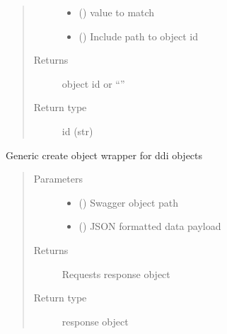 \documentclass[letterpaper,10pt,english]{sphinxmanual}
\begin{document}
\begin{fulllineitems}
\begin{fulllineitems}
\begin{quote}
\begin{description}
\begin{itemize}
\item {} 
\sphinxAtStartPar
{} () \textendash{} value to match

\item {} 
\sphinxAtStartPar
{} () \textendash{} Include path to object id

\end{itemize}

\item[{Returns}] \leavevmode
\sphinxAtStartPar
object id or “”

\item[{Return type}] \leavevmode
\sphinxAtStartPar
id (str)

\end{description}\end{quote}

\end{fulllineitems}


\begin{fulllineitems}
\label{\detokenize{b1bootstrap-class:bloxone.b1bootstrap.update}}
\sphinxAtStartPar
Generic create object wrapper for ddi objects
\begin{quote}\begin{description}
\item[{Parameters}] \leavevmode\begin{itemize}
\item {} 
\sphinxAtStartPar
{} () \textendash{} Swagger object path

\item {} 
\sphinxAtStartPar
{} () \textendash{} JSON formatted data payload

\end{itemize}

\item[{Returns}] \leavevmode
\sphinxAtStartPar
Requests response object

\item[{Return type}] \leavevmode
\sphinxAtStartPar
response object

\end{description}\end{quote}

\end{fulllineitems}


\end{fulllineitems}
\end{document}
